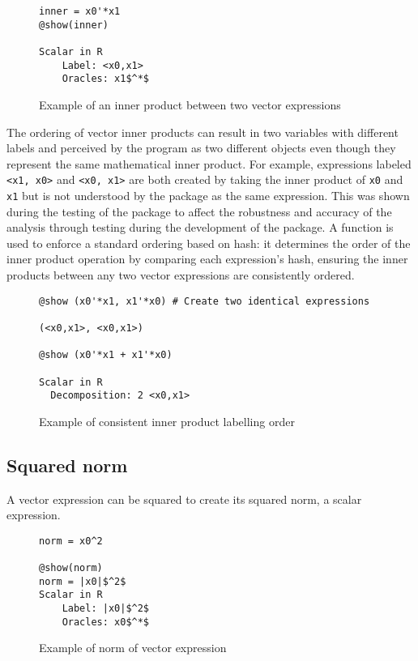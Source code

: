 \begin{figure}[!h]
	\begin{lstlisting}[mathescape]
inner = x0'*x1
@show(inner)

Scalar in R
	Label: <x0,x1>
	Oracles: x1$^*$

	\end{lstlisting}
	\caption{Example of an inner product between two vector expressions}
	\label{ex_inner}
\end{figure}

The ordering of vector inner products can result in two variables with different labels and perceived by the program as two different objects even though they represent the same mathematical inner product. For example, expressions labeled \texttt{<x1, x0>} and \texttt{<x0, x1>} are both created by taking the inner product of \texttt{x0} and \texttt{x1} but is not understood by the package as the same expression. This was shown during the testing of the package to affect the robustness and accuracy of the analysis through testing during the development of the package. A function is used to enforce a standard ordering based on hash: it determines the order of the inner product operation by comparing each expression's hash, ensuring the inner products between any two vector expressions are consistently ordered.

\begin{figure}[!h]
	\begin{lstlisting}[mathescape]
@show (x0'*x1, x1'*x0) # Create two identical expressions

(<x0,x1>, <x0,x1>)

@show (x0'*x1 + x1'*x0)

Scalar in R
  Decomposition: 2 <x0,x1>
	\end{lstlisting}
	\caption{Example of consistent inner product labelling order}
	\label{ex_hashorder}
\end{figure}

\subsection*{Squared norm}
A vector expression can be squared to create its squared norm, a scalar expression.
\begin{figure}[!h]
	\begin{lstlisting}[mathescape]
norm = x0^2

@show(norm)
norm = |x0|$^2$
Scalar in R
	Label: |x0|$^2$
	Oracles: x0$^*$
\end{lstlisting}
\caption{Example of norm of vector expression}
\label{ex_norm}
\end{figure}

